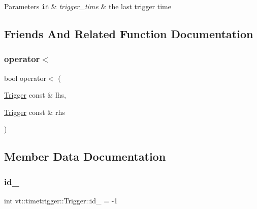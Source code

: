 \begin{DoxyParams}[1]{Parameters}
\mbox{\tt in}  & {\em trigger\+\_\+time} & the last trigger time \\
\hline
\end{DoxyParams}


\subsection{Friends And Related Function Documentation}
\mbox{\label{structvt_1_1timetrigger_1_1_trigger_a9e42ae58737ff5be162e315dd41b1ee2}} 
\subsubsection{\texorpdfstring{operator$<$}{operator<}}
{\footnotesize\ttfamily bool operator$<$ (\begin{DoxyParamCaption}\item[{\hyperlink{structvt_1_1timetrigger_1_1_trigger}{Trigger} const \&}]{lhs,  }\item[{\hyperlink{structvt_1_1timetrigger_1_1_trigger}{Trigger} const \&}]{rhs }\end{DoxyParamCaption})\hspace{0.3cm}{\ttfamily [friend]}}



\subsection{Member Data Documentation}
\mbox{\label{structvt_1_1timetrigger_1_1_trigger_a1a640c2311fa49ed0a7b79480dda4439}} 
\subsubsection{\texorpdfstring{id\+\_\+}{id\_}}
{\footnotesize\ttfamily int vt\+::timetrigger\+::\+Trigger\+::id\+\_\+ = -\/1\hspace{0.3cm}{\ttfamily [private]}}


